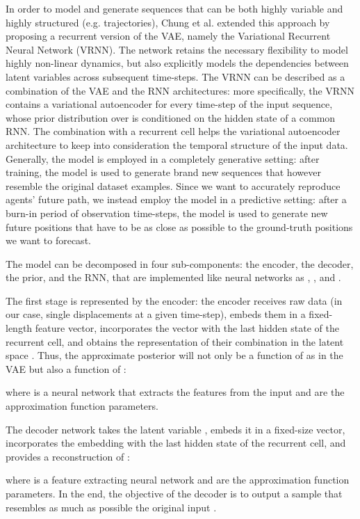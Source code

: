 \documentclass[10pt,a4paper,conference]{IEEEtran}
\begin{document}
In order to model and generate sequences that can be both highly variable and highly structured (e.g. trajectories), Chung et al. \cite{vrnn} extended this approach by proposing a recurrent version of the VAE, namely the Variational Recurrent Neural Network (VRNN). The network retains the necessary flexibility to model highly non-linear dynamics, but also explicitly models the dependencies between latent variables across subsequent time-steps. The VRNN can be described as a combination of the VAE and the RNN architectures: more specifically, the VRNN contains a variational autoencoder for every time-step of the input sequence, whose prior distribution over  is conditioned on the hidden state  of a common RNN. The combination with a recurrent cell helps the variational autoencoder architecture to keep into consideration the temporal structure of the input data. Generally, the model is employed in a completely generative setting: after training, the model is used to generate brand new sequences that however resemble the original dataset examples. Since we want to accurately reproduce agents' future path, we instead employ the model in a predictive setting: after a burn-in period of  observation time-steps, the model is used to generate  new future positions that have to be as close as possible to the ground-truth positions we want to forecast.  


The model can be decomposed in four sub-components: the encoder, the decoder, the prior, and the RNN, that are implemented like neural networks as , ,  and . 

The first stage is represented by the encoder: the encoder receives raw data (in our case, single  displacements at a given time-step), embeds them in a fixed-length feature vector, incorporates the vector with the last hidden state  of the recurrent cell, and obtains the representation of their combination in the latent space . Thus, the approximate posterior will not only be a function of  as in the VAE but also a function of :

where  is a neural network that extracts the features from the input and  are the approximation function parameters.

The decoder network takes the latent variable , embeds it in a fixed-size vector, incorporates the embedding with the last hidden state  of the recurrent cell, and provides a reconstruction  of  :

where  is a feature extracting neural network and  are the approximation function parameters.
In the end, the objective of the decoder is to output a sample  that resembles as much as possible the original input .
\end{document}
